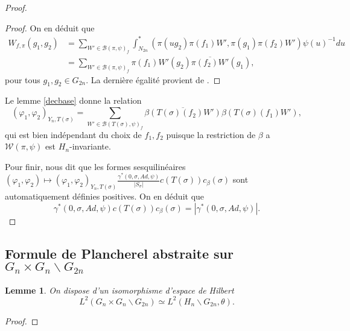 \documentclass{amsart}
\newtheorem{lemme}{Lemme}[section]
\begin{document}
\begin{proof}
\begin{proof}
On en déduit que
\begin{equation}
\begin{split}
W_{f, \pi}(g_1, g_2) &= \sum_{W' \in \mathcal{B}(\pi, \psi)_f} \int_{N_{2n}}^* (\pi(ug_2)\pi(f_1)W', \pi(g_1)\pi(f_2)W')\psi(u)^{-1}du \\
&= \sum_{W' \in \mathcal{B}(\pi, \psi)_f} \pi(f_1)W'(g_2)\overline{\pi(f_2)W'}(g_1),
\end{split}
\end{equation}
pour tous $g_1, g_2 \in G_{2n}$. La dernière égalité provient de \cite[Prop 2.14.2]{beuzart-plessis}.
\end{proof}

Le lemme \ref{decbase} donne la relation
\begin{equation}
(\varphi_1, \varphi_2)_{Y_n, T(\sigma)} = \sum_{W' \in \mathcal{B}(T(\sigma), \psi)_f} \overline{\beta(T(\sigma)(f_2)W')} \beta(T(\sigma)(f_1)W'),
\end{equation}
qui est bien indépendant du choix de $f_1,f_2$ puisque la restriction de $\beta$ a $\mathcal{W}(\pi, \psi)$ est $H_n$-invariante.

Pour finir, \cite[prop 4.1.1]{beuzart-plessis} nous dit que les formes sesquilinéaires $(\varphi_1, \varphi_2) \mapsto (\varphi_1, \varphi_2)_{Y_n, T(\sigma)} \frac{\gamma^*(0, \sigma, Ad, \psi)}{|S_\sigma|} c(T(\sigma))c_\beta(\sigma)$ sont automatiquement définies positives. On en déduit que 
\begin{equation}
\gamma^*(0, \sigma, Ad, \psi) c(T(\sigma))c_\beta(\sigma) = |\gamma^*(0, \sigma, Ad, \psi)|.
\end{equation}
\end{proof}

\subsection{Formule de Plancherel abstraite sur $G_n \times G_n \backslash G_{2n}$}

\begin{lemme}
\label{lemmeiso}
On dispose d'un isomorphisme d'espace de Hilbert
\begin{equation}
L^2(G_n \times G_n \backslash G_{2n}) \simeq L^2(H_n \backslash G_{2n}, \theta).
\end{equation}
\end{lemme}

\begin{proof}

\end{proof}
\end{document}
